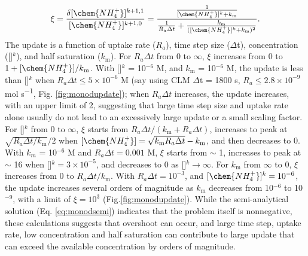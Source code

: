 \documentclass[gmd, manuscript]{copernicus}
\begin{document}
\begin{equation}
\xi = \frac{\delta [\chem{NH_4^+}]^{k+1,1}}{[\chem{NH_4^+}]^{k+1,0}} =
\frac{\frac{1}{[\chem{NH_4^+}]^{k}+k_\text{m}}}{\frac{1}{R_a
\Delta t}+\frac{k_\text{m}}{([\chem{NH_4^+}]^{k}+k_\text{m})^2}}.
\end{equation}
The update is a function of uptake rate ($R_a$), time step size ($\Delta$t),
concentration ([]$^k$), and half saturation ($k_\text{m}$).
For $R_a\Delta t$ from 0 to $\infty$, $\xi$
increases from 0 to $1 + [\chem{NH_4^+}]/k_\text{m}$.
With []$^k$ = 10$^{-6}$ \unit{M}, and $k_\text{m}$ = 10$^{-6}$ \unit{M},
the update is less than []$^k$ when $R_a\Delta t \leq 5 \times 10^{-6}$
\unit{M} (say using CLM $\Delta$t = 1800 \unit{s}, $R_a \leq 2.8\times10^{-9}$
\unit{mol} \unit{s^{-1}}, Fig. \ref{fig:monodupdate}); when $R_a\Delta t$
increases, the update increases, with an upper limit of 2,
suggesting that large time step size and uptake rate alone usually do not lead
to an excessively large update or a small scaling factor.  
For []$^k$ from 0 to $\infty$, $\xi$ starts from $R_a\Delta
t/(k_\text{m}+R_a\Delta t)$, increases to peak at $\sqrt{R_a\Delta
t/k_\text{m}}/2$ when $[\chem{NH_4^+}] = \sqrt{k_\text{m}R_a\Delta
t}-k_\text{m}$, and then decreases to 0. 
With $k_m$ = 10$^{-6}$ \unit{M} and $R_a\Delta t=0.001$ \unit{M}, $\xi$ starts
from $\sim$ 1, increases to peak at $\sim$ 16 when []$^k = 3
\times 10^{-5}$, and decreases to 0 as []$^k \rightarrow \infty$.
For $k_\text{m}$ from $\infty$ to 0, $\xi$ increases from 0 to $R_a\Delta
t/k_\text{m}$. With $R_a\Delta t = 10^{-3}$, and $[\chem{NH_4^+}]^k = 10^{-6}$, 
the update increases several orders of magnitude as $k_\text{m}$ decreases from 10$^{-6}$
to 10$^{-9}$, with a limit of $\xi = 10^{3}$ (Fig.\ref{fig:monodupdate}). 
While the semi-analytical solution (Eq.
\ref{eq:monodsemi}) indicates that the problem itself is nonnegative, these
calculations suggests that overshoot can occur, and large time step, uptake
rate, low concentration and half saturation can contribute to large update that
can exceed the available concentration by orders of magnitude.
\end{document}
